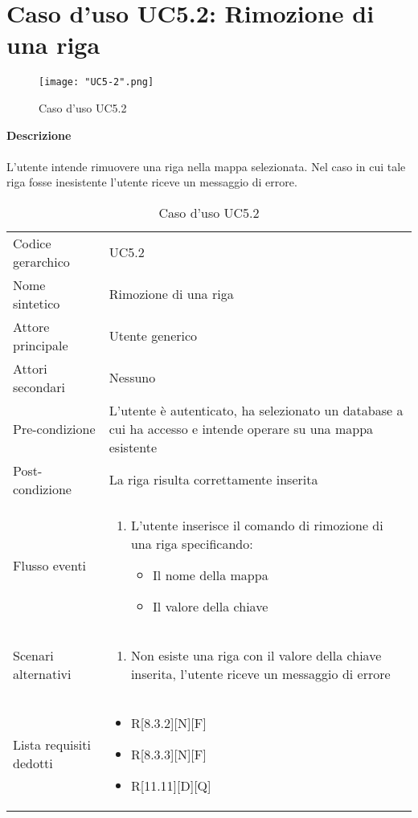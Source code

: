 \documentclass[a4paper]{report}
\begin{document}
	 \section{Caso d'uso UC5.2: Rimozione di una riga}
	 \begin{figure}[H]
			\centering
			\texttt{[image: "UC5-2".png]}
			\caption{Caso d'uso UC5.2}
		\end{figure}
	 \textbf{Descrizione} \\ \\
	 L'utente intende rimuovere una riga nella mappa selezionata. Nel caso in cui tale riga fosse inesistente
	 l'utente riceve un messaggio di errore.
		\begin{table}[H]
		\begin{tabularx}{\textwidth}{X | X}\toprule
			\rowcolor{orange!65}Codice gerarchico & UC5.2\\
			Nome sintetico & Rimozione di una riga\\
			\rowcolor{orange!65}Attore principale & Utente generico\\
			Attori secondari & Nessuno \\
			\rowcolor{orange!65}Pre-condizione & L'utente è autenticato, ha selezionato un database a cui ha 
			accesso e intende operare su una mappa esistente\\
			Post-condizione & La riga risulta correttamente inserita\\
			\rowcolor{orange!65}Flusso eventi & \begin{enumerate}
			\item L'utente inserisce il comando di rimozione di una riga specificando:
			\begin{itemize}
				\item Il nome della mappa
				\item Il valore della chiave
			\end{itemize}
			\end{enumerate} \\
			Scenari alternativi & \begin{enumerate}
			\item Non esiste una riga con il valore della chiave inserita, l'utente riceve un messaggio di errore
			\end{enumerate}			 \\
			\rowcolor{orange!65}Lista requisiti dedotti & \begin{itemize}
				\item R[8.3.2][N][F]
				\item R[8.3.3][N][F]
				\item R[11.11][D][Q]
				\end{itemize} \\
			\bottomrule
		\end{tabularx}
		\caption{Caso d'uso UC5.2}
	 \end{table}
	 
\end{document}
